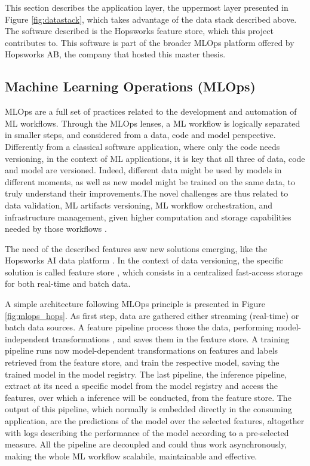 This section describes the application layer, the uppermost layer presented in Figure \ref{fig:datastack}, which takes advantage of the data stack described above. The software described is the Hopsworks feature store, which this project contributes to. This software is part of the broader \gls{MLOps} platform offered by Hopsworks AB, the company that hosted this master thesis.


\subsection{Machine Learning Operations (MLOps)}
\label{subsec:back_mlops}

\gls{MLOps} are a full set of practices related to the development and automation of \gls{ML} workflows. Through the \gls{MLOps} lenses, a \gls{ML} workflow is logically separated in smaller steps, and considered from a data, code and model perspective. Differently from a classical software application, where only the code needs versioning, in the context of \gls{ML} applications, it is key that all three of data, code and model are versioned. Indeed, different data might be used by models in different moments, as well as new model might be trained on the same data, to truly understand their improvements.The novel challenges are thus related to data validation, \gls{ML} artifacts versioning, \gls{ML} workflow orchestration, and infrastructure management, given higher computation and storage capabilities needed by those workflows \cite{SurgeAI2024,PDFBigData2024}.

The need of the described features saw new solutions emerging, like the Hopsworks AI data platform \cite{HopsworksRealtimeAI}. In the context of data versioning, the specific solution is called feature store \cite{MeetMichelangeloUbers2017}, which consists in a centralized fast-access storage for both real-time and batch data.

A simple architecture following \gls{MLOps} principle is presented in Figure \ref{fig:mlops_hops}. As first step, data are gathered either streaming (real-time) or batch data sources. A feature pipeline process those the data, performing model-independent transformations \cite{BigDictionaryMLOps2024}, and saves them in the feature store. A training pipeline runs now model-dependent transformations on features and labels retrieved from the feature store, and train the respective model, saving the trained model in the model registry. The last pipeline, the inference pipeline, extract at its need a specific model from the model registry and access the features, over which a inference will be conducted, from the feature store. The output of this pipeline, which normally is embedded directly in the consuming application, are the predictions of the model over the selected features, altogether with logs describing the performance of the model according to a pre-selected measure. All the pipeline are decoupled and could thus work asynchronously, making the whole \gls{ML} workflow scalabile, maintainable and effective.

